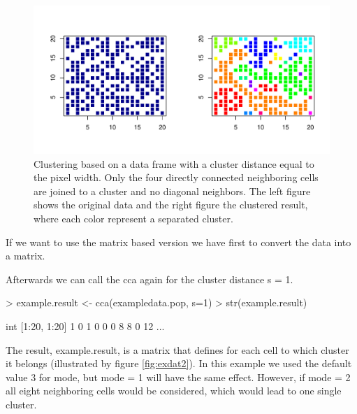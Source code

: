 \documentclass[10pt,a4paper]{article}
\begin{document}
\begin{figure}
\centering
\includegraphics{pics/exdat1.pdf}
\caption{Clustering based on a data frame with a cluster distance equal to the pixel width. Only the four directly connected neighboring cells are joined to a cluster and no diagonal neighbors. The left figure shows the original data and the right figure the clustered result, where each color represent a separated cluster.}
\label{fig:exdat1}
\end{figure}


If we want to use the matrix based version we have first to convert the data into a matrix.

\begin{Schunk}
\end{Schunk}

Afterwards we can call the cca again for the cluster distance s = 1.

\begin{Schunk}
\begin{Sinput}
> example.result <- cca(exampledata.pop, s=1)
> str(example.result)
\end{Sinput}
\begin{Soutput}
 int [1:20, 1:20] 1 0 1 0 0 0 8 8 0 12 ...
\end{Soutput}
\end{Schunk}

The result, example.result, is a matrix that defines for each cell to which cluster it belongs (illustrated by figure \ref{fig:exdat2}). In this example we used the default value 3 for mode, but mode = 1 will have the same effect. However, if mode = 2 all eight neighboring cells would be considered, which would lead to one single cluster. 
\end{document}
